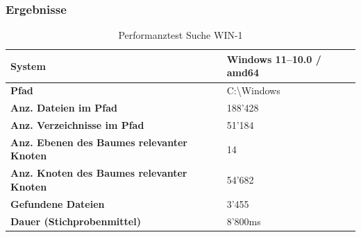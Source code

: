 \documentclass[a4paper,12pt]{report}
\begin{document}
    \newpage

    \subsubsection{Ergebnisse}
    \begin{table}[h!]
        \centering
        \setlength{\leftmargini}{0.8cm}
        \begin{tabular}{|p{7cm}|p{5cm}|}
            \hline
            \textbf{System}                                            & Windows 11--10.0 / amd64 \\ \hline
            \textbf{Pfad}                                              & C:\textbackslash Windows \\ \hline
            \textbf{Anz. Dateien im Pfad}                              & 188'428                  \\ \hline
            \textbf{Anz. Verzeichnisse im Pfad}                        & 51'184                   \\ \hline
            \textbf{Anz. Ebenen \newline des Baumes relevanter Knoten} & 14                       \\ \hline
            \textbf{Anz. Knoten \newline des Baumes relevanter Knoten} & 54'682                   \\ \hline
            \textbf{Gefundene Dateien}                                 & 3'455                    \\ \hline
            \textbf{Dauer (Stichprobenmittel)}                         & 8'800ms                  \\ \hline
        \end{tabular}
        \caption{Performanztest Suche WIN-1}\label{tab:perf-search-win-1}
    \end{table}
\end{document}

